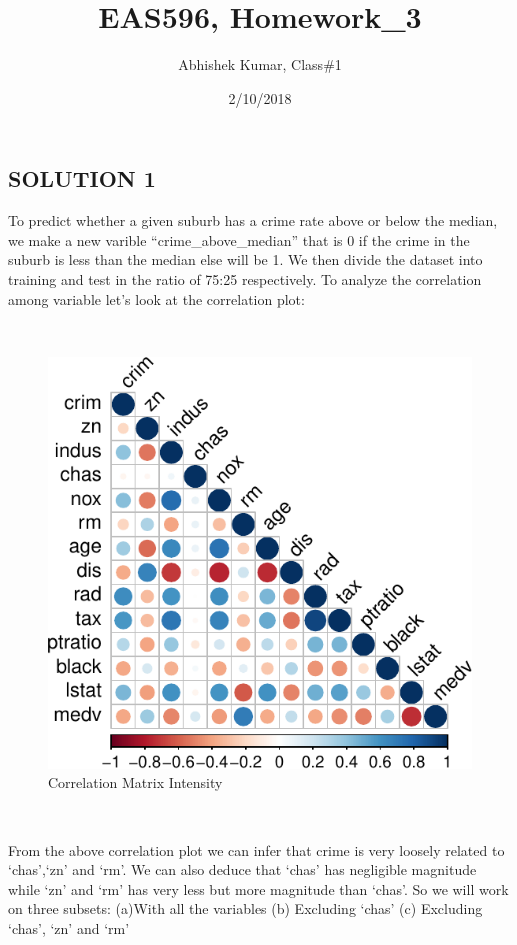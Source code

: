 \documentclass[]{article}
\title{EAS596, Homework\_3}
\author{Abhishek Kumar, Class\#1}
\date{2/10/2018}
\begin{document}
\maketitle

\subsection{SOLUTION 1}\label{solution-1}

To predict whether a given suburb has a crime rate above or below the
median, we make a new varible ``crime\_above\_median'' that is 0 if the
crime in the suburb is less than the median else will be 1. We then
divide the dataset into training and test in the ratio of 75:25
respectively. To analyze the correlation among variable let's look at
the correlation plot:

~

\begin{figure}[h]

{\centering \includegraphics{HW3_files/figure-latex/unnamed-chunk-1-1} 

}

\caption{Correlation Matrix Intensity}\label{fig:unnamed-chunk-1}
\end{figure}

~

From the above correlation plot we can infer that crime is very loosely
related to `chas',`zn' and `rm'. We can also deduce that `chas' has
negligible magnitude while `zn' and `rm' has very less but more
magnitude than `chas'. So we will work on three subsets: (a)With all the
variables (b) Excluding `chas' (c) Excluding `chas', `zn' and `rm'
\end{document}
